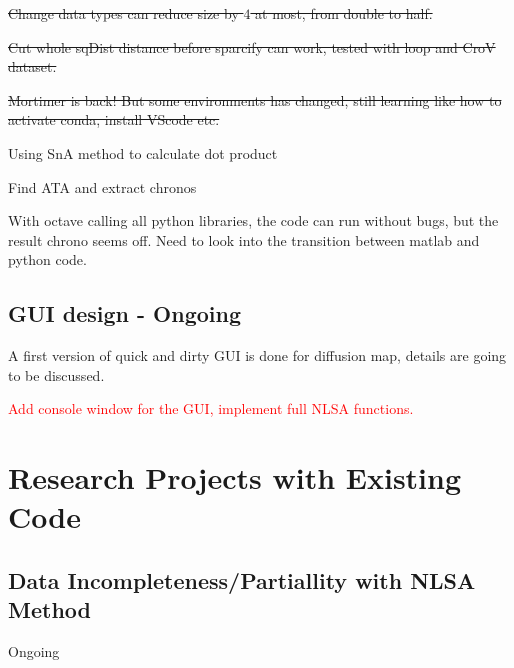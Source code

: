 \documentclass{article}
\begin{document}
\st{Change data types can reduce size by $4$ at most, from double to half.}

\st{Cut whole sqDist distance before sparcify can work, tested with loop and CroV dataset.}

\st{Mortimer is back! But some environments has changed, still learning like how to activate conda, install VScode etc.}


\noindent Using SnA method to calculate dot product

\noindent Find ATA and extract chronos

\noindent With octave calling all python libraries, the code can run without bugs, but the result chrono seems off. Need to look into the transition between matlab and python code.

\subsection*{GUI design - Ongoing}
A first version of quick and dirty GUI is done for diffusion map, details are going to be discussed.



\noindent \textcolor{red}{Add console window for the GUI, implement full NLSA functions.}
\section*{Research Projects with Existing Code}
\subsection*{Data Incompleteness/Partiallity with NLSA Method}
Ongoing
\end{document}
